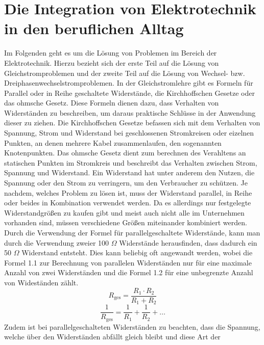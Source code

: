 \section{Die Integration von Elektrotechnik in den beruflichen Alltag}

Im Folgenden geht es um die Lösung von Problemen im Bereich der Elektrotechnik. Hierzu bezieht sich der erste Teil auf die Lösung von Gleichstromproblemen und der 
zweite Teil auf die Lösung von Wechsel- bzw. Dreiphasenwechselstromproblemen. In der Gleichstromlehre gibt es \zB Formeln für Parallel oder in Reihe 
geschaltete Widerstände, die Kirchhoffschen Gesetze oder das ohmsche 
Gesetz. Diese Formeln dienen dazu, dass Verhalten von Widerständen zu beschreiben, um daraus praktische Schlüsse in der Anwendung dieser zu ziehen. 
Die Kirchhoffschen Gesetze befassen sich mit dem Verhalten von Spannung, Strom und Widerstand bei geschlossenen Stromkreisen oder eizelnen Punkten, an denen 
mehrere Kabel zusammenlaufen, den sogenannten Knotenpunkten. Das ohmsche Gesetz dient zum berechnen des Verahltens an statischen Punkten im Stromkreis und 
beschreibt das Verhalten zwischen Strom, Spannung und Widerstand. Ein Widerstand hat unter anderem den Nutzen, die Spannung oder den Strom zu verringern, um 
den Verbraucher zu schützen. Je nachdem, welches Problem zu lösen ist, muss der Widerstand parallel, in Reihe oder beides in Kombination verwendet werden. 
Da es allerdings nur festgelegte Widerstandgrößen zu kaufen gibt und meist auch nicht alle im Unternehmen vorhanden sind, müssen verschiedene Größen miteinander
kombiniert werden. Durch die Verwendung der Formel für parallelgeschaltete Widerstände, kann man \zB durch die Verwendung zweier 100 $\Omega$ Widerstände 
herausfinden, dass dadurch ein 50 $\Omega$ Widerstand entsteht. 
Dies kann beliebig oft angewandt werden, wobei die Formel 1.1 zur Berechnung von parallelen Widerständen nur für eine maximale Anzahl von zwei 
Widerständen und die Formel 1.2 für eine unbegrenzte Anzahl von Wideständen zählt.
\begin{equation}
R_{\text{ges}}=\frac{R_1 \cdot R_2}{R_1+R_2}
\label{eqn:Parallelschaltung von 2 Widerständen}
\end{equation}
\begin{equation}
\frac{1}{R_{\text{ges}}}=\frac{1}{R_1}+\frac{1}{R_2}+\dots
\label{eqn:Parallelschaltung von mehreren Widerständen}
\end{equation}
Zudem ist bei parallelgeschalteten Widerständen zu beachten, dass die Spannung, welche über den Widerständen abfällt gleich bleibt und diese Art der 
